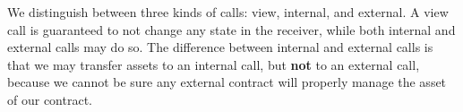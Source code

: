 \documentclass[dvipsnames, usenames, sigconf]{acmart}
\begin{document}
We distinguish between three kinds of calls: view, internal, and external.
A view call is guaranteed to not change any state in the receiver, while both internal and external calls may do so.
The difference between internal and external calls is that we may transfer assets to an internal call, but \textbf{not} to an external call, because we cannot be sure any external contract will properly manage the asset of our contract.
\begin{mathpar}



\end{mathpar}
\end{document}
